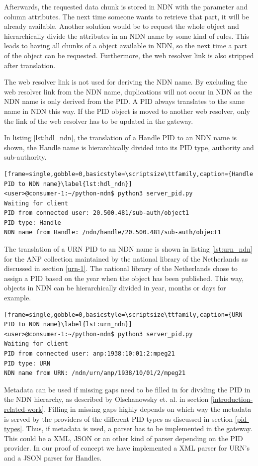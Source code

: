 Afterwards, the requested data chunk is stored in NDN with the parameter and column attributes. The next time someone wants to retrieve that part, it will be already available. Another solution would be to request the whole object and hierarchically divide the attributes in an NDN name by some kind of rules. This leads to having all chunks of a object available in NDN, so the next time a part of the object can be requested.
Furthermore, the web resolver link is also stripped after translation.

The web resolver link is not used for deriving the NDN name.
By excluding the web resolver link from the NDN name, duplications will not occur in NDN as the NDN name is only derived from the PID. A PID always translates to the same name in NDN this way. 
If the PID object is moved to another web resolver, only the link of the web resolver has to be updated in the gateway. 

In listing \ref{lst:hdl_ndn}, the translation of a Handle PID to an NDN name is shown, the Handle name is hierarchically divided into its PID type, authority and sub-authority.
\vspace{1em}
\begin{lstlisting}[frame=single,gobble=0,basicstyle=\scriptsize\ttfamily,caption={Handle PID to NDN name}\label{lst:hdl_ndn}]
<user>@consumer-1:~/python-ndn$ python3 server_pid.py
Waiting for client
PID from connected user: 20.500.481/sub-auth/object1
PID type: Handle
NDN name from Handle: /ndn/handle/20.500.481/sub-auth/object1
\end{lstlisting}

The translation of a URN PID to an NDN name is shown in listing \ref{lst:urn_ndn} for the ANP collection maintained by the national library of the Netherlands as discussed in section \ref{urn-1}. The national library of the Netherlands chose to assign a PID based on the year when the object has been published. 
This way, objects in NDN can be hierarchically divided in year, months or days for example.
\vspace{1em}
\begin{lstlisting}[frame=single,gobble=0,basicstyle=\scriptsize\ttfamily,caption={URN PID to NDN name}\label{lst:urn_ndn}]
<user>@consumer-1:~/python-ndn$ python3 server_pid.py
Waiting for client
PID from connected user: anp:1938:10:01:2:mpeg21
PID type: URN
NDN name from URN: /ndn/urn/anp/1938/10/01/2/mpeg21
\end{lstlisting}

Metadata can be used if missing gaps need to be filled in for dividing the PID in the NDN hierarchy, as described by Olschanowsky et. al. \cite{ndn-clim} in section \ref{introduction-related-work}. 
Filling in missing gaps highly depends on which way the metadata is served by the providers of the different PID types as discussed in section \ref{pid-types}. Thus, if metadata is used, a parser has to be implemented in the gateway. This could be a XML, JSON or an other kind of parser depending on the PID provider. In our proof of concept we have implemented a XML parser for URN's and a JSON parser for Handles.

